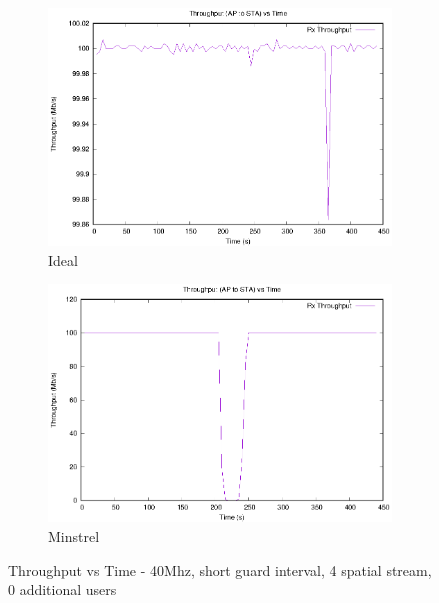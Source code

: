 \documentclass[12]{article}
\begin{document}

\begin{figure}[!htb]
\begin{subfigure}{.5\textwidth}
  \centering
  \includegraphics[width=\linewidth]{"40Mhz_Short_4SS_0AU/Ideal/DistanceThroughput"}
  \caption{Ideal}
  \label{fig:40_id_tt}
\end{subfigure}%
\begin{subfigure}{.5\textwidth}
  \includegraphics[width=\linewidth]{"40Mhz_Short_4SS_0AU/MinstrelHt/DistanceThroughput"}
  \caption{Minstrel}
  \label{fig:40_mi_tt}
\end{subfigure}%
\caption{Throughput vs Time - 40Mhz, short guard interval, 4 spatial stream, 0 additional users}
\label{fig:40_tt}
\end{figure}
\end{document}
